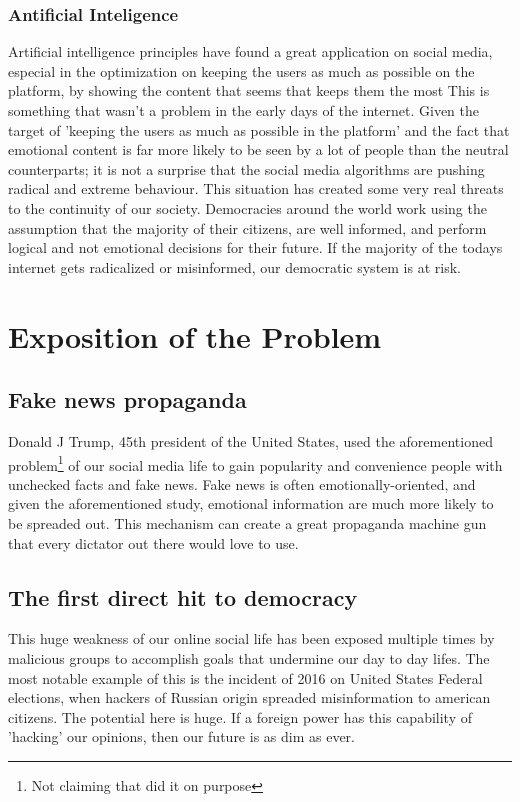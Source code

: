 \documentclass[openany]{article}
\begin{document}
	\subsubsection*{Antificial Inteligence}
		Artificial intelligence principles have found a great application on social media, especial in the optimization
		on keeping the users as much as possible on the platform, by showing the content that seems that keeps them the most\cite{dark-ai}
		This is something that wasn't a problem in the early days of the internet. Given the target of 'keeping the users as much as possible 
		in the platform' and the fact that emotional content is far more likely to be seen by a lot of people than the neutral counterparts; 
		it is not a surprise that the social media algorithms are pushing radical and extreme behaviour\cite{youtube-radicalize}. This situation
		has created some very real threats to the continuity of our society. Democracies around the world work using the assumption that the majority of
		their citizens, are well informed, and perform logical and not emotional decisions for their future. If the majority of the todays internet gets 
		radicalized or misinformed, our  democratic system is at risk.
	\section{Exposition of the Problem}
	\subsection*{Fake news propaganda}
		Donald J Trump, 45th president of the United States, used the aforementioned problem\footnote{Not claiming that did it on purpose} of 
		our social media life to gain popularity and convenience people with unchecked facts and fake news\cite{trump}. 
		Fake news is often emotionally-oriented, and given the aforementioned study, emotional information are much more likely to be spreaded out. 
		This mechanism can create a great propaganda machine gun that every dictator out there would love to use. 
	\subsection*{The first direct hit to democracy}
		This huge weakness of our online social life has been exposed multiple times by malicious groups to accomplish
		goals that undermine our day to day lifes. The most notable example of this is the incident of 2016 on United States Federal
		elections, when hackers of Russian origin spreaded misinformation to american citizens\cite{russian-hackers-1,russian-hackers-2,russian-hackers-3}.
		The potential here is huge. If a foreign power has this capability of 'hacking' our opinions, then our future is as dim as ever.
\end{document}
